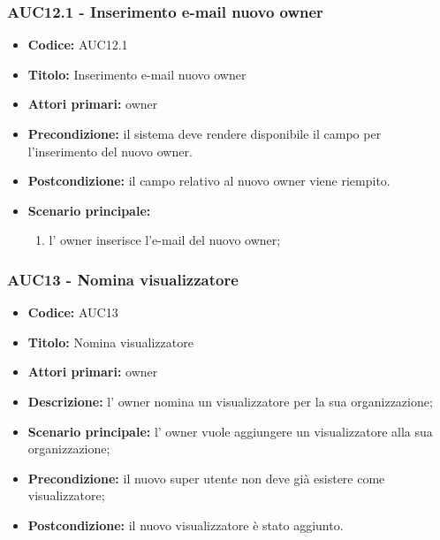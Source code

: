\documentclass[casi-duso]{subfiles}
\begin{document}
\subsubsection{AUC12.1 - Inserimento e-mail nuovo owner}%
\label{subsub:AUC12.1}
\begin{itemize}
  \item \textbf{Codice:} AUC12.1
  \item \textbf{Titolo:} Inserimento e-mail nuovo owner
  \item \textbf{Attori primari:} owner
  \item \textbf{Precondizione:} il sistema deve rendere disponibile il campo per l'inserimento del nuovo owner.
  \item \textbf{Postcondizione:} il campo relativo al nuovo owner viene riempito.
  \item \textbf{Scenario principale:} 
  \begin{enumerate}
    \item l' owner inserisce l'e-mail del nuovo owner;
  \end{enumerate}
\end{itemize}

\subsubsection{AUC13 - Nomina visualizzatore}%
\label{subsub:AUC13}
\begin{itemize}
  \item \textbf{Codice:} AUC13
  \item \textbf{Titolo:} Nomina visualizzatore
  \item \textbf{Attori primari:} owner
  \item \textbf{Descrizione:} l' owner nomina un visualizzatore per la sua organizzazione;
  \item \textbf{Scenario principale:} l' owner vuole aggiungere un visualizzatore alla sua organizzazione;
  \item \textbf{Precondizione:} il nuovo super utente non deve già esistere come visualizzatore;
  \item \textbf{Postcondizione:} il nuovo visualizzatore è stato aggiunto.
\end{itemize}
\end{document}

